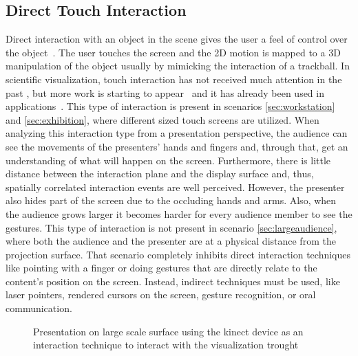 \documentclass[review,journal]{vgtc}         %
\begin{document}
\subsection{Direct Touch Interaction}
Direct interaction with an object in the scene gives the user a feel of control over the object~\cite{isenberg2009studying}. 
The user touches the screen and the 2D motion is mapped to a 3D manipulation of the object usually by mimicking the interaction of a trackball.
In scientific visualization, touch interaction has not received much attention in the past \cite{isenberg:hal-00781512}, but more work is starting to appear~\cite{Klein:2012:DSD:2322389.2322403} and it has already been used in applications~\cite{LRFPY11}.
This type of interaction is present in scenarios \ref{sec:workstation} and \ref{sec:exhibition}, where different sized touch screens are utilized. 
When analyzing this interaction type from a presentation perspective, the audience can see the movements of the presenters' hands and fingers and, through that, get an understanding of what will happen on the screen.
Furthermore, there is little distance between the interaction plane and the display surface and, thus, spatially correlated interaction events are well perceived.
However, the presenter also hides part of the screen due to the occluding hands and arms.
Also, when the audience grows larger it becomes harder for every audience member to see the gestures.
This type of interaction is not present in scenario \ref{sec:largeaudience}, where both the audience and the presenter are at a physical distance from the projection surface.
That scenario completely inhibits direct interaction techniques like pointing with a finger or doing gestures that are directly relate to the content's position on the screen.
Instead, indirect techniques must be used, like laser pointers, rendered cursors on the screen, gesture recognition, or oral communication.

\begin{figure}[htb]
	\centering
	\caption{Presentation on large scale surface using the kinect device as an interaction technique to interact with the visualization trought}
	\label{img:dome_clip}
\end{figure}
\end{document}
